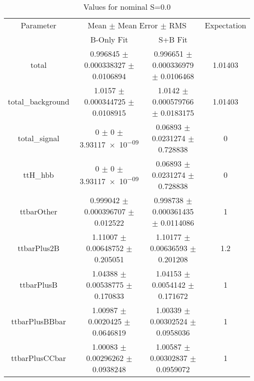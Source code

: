 \begin{table}
\centering
\caption{Values for nominal S=0.0}
\begin{tabular}{cccc}
\toprule
Parameter & \multicolumn{2}{c}{Mean $\pm$ Mean Error $\pm$ RMS} & Expectation\\
 & B-Only Fit & S+B Fit & \\
\midrule
total & \num{0.996845} $\pm$ \num{0.000338327} $\pm$ \num{0.0106894} & \num{0.996651} $\pm$ \num{0.000336979} $\pm$ \num{0.0106468} & \num{1.01403}\\
total\_background & \num{1.0157} $\pm$ \num{0.000344725} $\pm$ \num{0.0108915} & \num{1.0142} $\pm$ \num{0.000579766} $\pm$ \num{0.0183175} & \num{1.01403}\\
total\_signal & \num{0} $\pm$ \num{0} $\pm$ \num{3.93117e-09} & \num{0.06893} $\pm$ \num{0.0231274} $\pm$ \num{0.728838} & \num{0}\\
ttH\_hbb & \num{0} $\pm$ \num{0} $\pm$ \num{3.93117e-09} & \num{0.06893} $\pm$ \num{0.0231274} $\pm$ \num{0.728838} & \num{0}\\
ttbarOther & \num{0.999042} $\pm$ \num{0.000396707} $\pm$ \num{0.012522} & \num{0.998738} $\pm$ \num{0.000361435} $\pm$ \num{0.0114086} & \num{1}\\
ttbarPlus2B & \num{1.11007} $\pm$ \num{0.00648752} $\pm$ \num{0.205051} & \num{1.10177} $\pm$ \num{0.00636593} $\pm$ \num{0.201208} & \num{1.2}\\
ttbarPlusB & \num{1.04388} $\pm$ \num{0.00538775} $\pm$ \num{0.170833} & \num{1.04153} $\pm$ \num{0.0054142} $\pm$ \num{0.171672} & \num{1}\\
ttbarPlusBBbar & \num{1.00987} $\pm$ \num{0.0020425} $\pm$ \num{0.0646819} & \num{1.00339} $\pm$ \num{0.00302524} $\pm$ \num{0.0958036} & \num{1}\\
ttbarPlusCCbar & \num{1.00083} $\pm$ \num{0.00296262} $\pm$ \num{0.0938248} & \num{1.00587} $\pm$ \num{0.00302837} $\pm$ \num{0.0959072} & \num{1}\\
\bottomrule
\end{tabular}
\end{table}